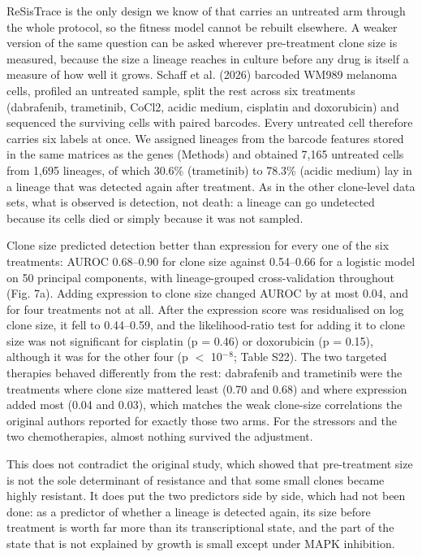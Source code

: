 \documentclass[11pt,a4paper]{article}
\begin{document}
ReSisTrace is the only design we know of that carries an untreated arm through the whole protocol, so the fitness model cannot be rebuilt elsewhere. A weaker version of the same question can be asked wherever pre-treatment clone size is measured, because the size a lineage reaches in culture before any drug is itself a measure of how well it grows. Schaff et al. (2026) barcoded WM989 melanoma cells, profiled an untreated sample, split the rest across six treatments (dabrafenib, trametinib, CoCl2, acidic medium, cisplatin and doxorubicin) and sequenced the surviving cells with paired barcodes. Every untreated cell therefore carries six labels at once. We assigned lineages from the barcode features stored in the same matrices as the genes (Methods) and obtained 7,165 untreated cells from 1,695 lineages, of which 30.6\% (trametinib) to 78.3\% (acidic medium) lay in a lineage that was detected again after treatment. As in the other clone-level data sets, what is observed is detection, not death: a lineage can go undetected because its cells died or simply because it was not sampled.

Clone size predicted detection better than expression for every one of the six treatments: AUROC 0.68--0.90 for clone size against 0.54--0.66 for a logistic model on 50 principal components, with lineage-grouped cross-validation throughout (Fig. 7a). Adding expression to clone size changed AUROC by at most 0.04, and for four treatments not at all. After the expression score was residualised on log clone size, it fell to 0.44--0.59, and the likelihood-ratio test for adding it to clone size was not significant for cisplatin (p = 0.46) or doxorubicin (p = 0.15), although it was for the other four (p $<$ 10$^-$$^8$; Table S22). The two targeted therapies behaved differently from the rest: dabrafenib and trametinib were the treatments where clone size mattered least (0.70 and 0.68) and where expression added most (0.04 and 0.03), which matches the weak clone-size correlations the original authors reported for exactly those two arms. For the stressors and the two chemotherapies, almost nothing survived the adjustment.

This does not contradict the original study, which showed that pre-treatment size is not the sole determinant of resistance and that some small clones became highly resistant. It does put the two predictors side by side, which had not been done: as a predictor of whether a lineage is detected again, its size before treatment is worth far more than its transcriptional state, and the part of the state that is not explained by growth is small except under MAPK inhibition.
\end{document}
